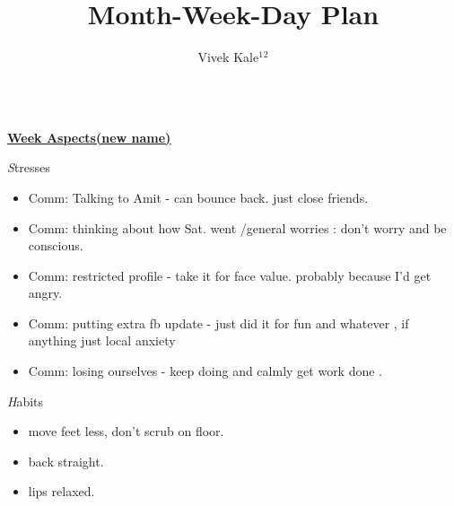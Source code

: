 \documentclass[serif,mathserif,final]{beamer}
\title{Month-Week-Day Plan}
\author{Vivek Kale$^1$$^2$}
\institute{$^1$ University of Illinois at Urbana-Champaign \quad}
\begin{document}
 
\begin{frame}{} 

  \begin{columns}[t]
\begin{column}{0.30\linewidth} {\textbf{\underline{Week Aspects(new name)}}}
  \begin{block}{\textit Stresses} 
    \begin{itemize}
    \item \tiny Comm: Talking to Amit - can bounce back. just close friends. 
    \item \tiny Comm:  thinking about how Sat. went /general worries : don't worry and be conscious. 
    \item \tiny Comm: restricted profile - take it for face value. probably because I'd get angry. 
    \item \tiny Comm: putting extra fb update - just did it for fun and whatever , if anything just local anxiety 
    \item \tiny Comm: losing ourselves - keep doing and calmly get work done . 

    \end{itemize} 
  \end{block} 
  
  \begin{block}{\textit Habits } 
    \begin{itemize} 
      \tiny \item \tiny move feet less, don't scrub on floor. 
    \item \tiny back straight. 
    \item \tiny lips relaxed. 
    \end{itemize} 
  \end{block} 


\end{column}
\end{columns}
\end{frame}
\end{document}
